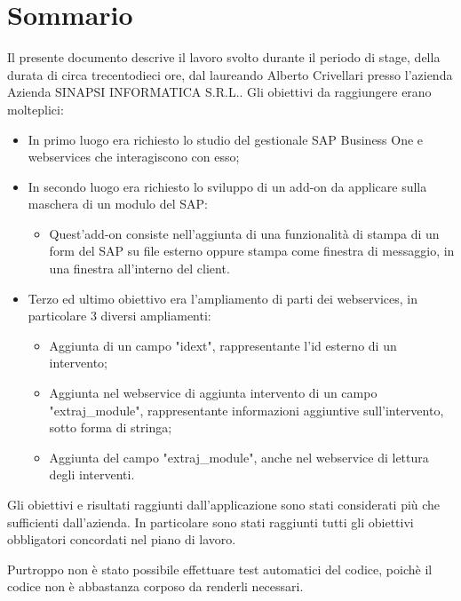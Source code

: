 
\cleardoublepage
{}
{}
\begingroup
\let\clearpage\relax
\let\cleardoublepage\relax
\let\cleardoublepage\relax

\chapter*{Sommario}

Il presente documento descrive il lavoro svolto durante il periodo di stage, della durata di circa trecentodieci ore, dal laureando Alberto Crivellari presso l'azienda Azienda SINAPSI INFORMATICA S.R.L..
Gli obiettivi da raggiungere erano molteplici:
\begin{itemize}
    \item In primo luogo era richiesto lo studio del gestionale SAP Business One e webservices che interagiscono con esso;
    \item In secondo luogo era richiesto lo sviluppo di un add-on da applicare sulla maschera di un modulo del SAP:
        \begin{itemize}
            \item Quest'add-on consiste nell'aggiunta di una funzionalità di stampa di un form del SAP su file esterno oppure stampa come finestra di messaggio, in una finestra all'interno del client.
        \end{itemize}
    \item Terzo ed ultimo obiettivo era l'ampliamento di parti dei webservices, in particolare 3 diversi ampliamenti:
        \begin{itemize}
            \item Aggiunta di un campo "idext", rappresentante l'id esterno di un intervento;
            \item Aggiunta nel webservice di aggiunta intervento di un campo "extraj\_module", rappresentante informazioni aggiuntive sull'intervento, sotto forma di stringa;
            \item Aggiunta del campo "extraj\_module", anche nel webservice di lettura degli interventi.
        \end{itemize}
\end{itemize}


Gli obiettivi e risultati raggiunti dall'applicazione sono stati considerati più che sufficienti dall'azienda.
In particolare sono stati raggiunti tutti gli obiettivi obbligatori concordati nel piano di lavoro.

Purtroppo non è stato possibile effettuare test automatici del codice, poichè il codice non è abbastanza corposo da renderli necessari.
%
%

\endgroup			

\vfill

